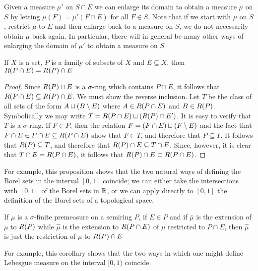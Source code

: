 Given a measure $\mu'$ on $S \cap E$ we can enlarge its domain to obtain a measure $\mu$ on $S$ by letting $\mu(F)=\mu'(F \cap E)$ for all $F \in S$. Note that if we start with $\mu$ on $S$, restrict $\mu$ to $E$ and then enlarge back to a measure on $S$, we do not necessarily obtain $\mu$ back again. In particular, there will in general be many other ways of enlarging the domain of $\mu'$ to obtain a measure on $S$

\begin{proposition}
If $X$ is a set, $P$ is a family of subsets of $X$ and $E \subseteq X$, then $R(P \cap E)=R(P) \cap E$
\end{proposition}


\begin{proof}
Since $R(P) \cap E$ is a $\sigma$-ring which contains $P \cap E$, it follows that $R(P \cap E) \subseteq R(P) \cap E$. We must show the reverse inclusion. Let $T$ be the class of all sets of the form $A\sqcup(B\setminus E)$ where $A \in R(P \cap E)$ and $B \in R(P)$. Symbolically we may write $T=R(P \cap E)\sqcup(R(P)\cap E')$. It is easy to verify that $T$ is a $\sigma$-ring. If $F \in P$, then the relation $F=(F \cap E) \sqcup(F\setminus E)$ and the fact that $F \cap E \in P \cap E \subseteq R(P \cap E)$ show that $F \in T$, and therefore that $P \subseteq T$. It follows that $R(P) \subseteq T$, and therefore that $R(P) \cap E \subseteq T \cap E$. Since, however, it is clear that $T \cap E=R(P \cap E)$, it follows that $R(P) \cap E \subset R(P \cap E)$.
\end{proof}

For example, this proposition shows that the two natural ways of defining the Borel sets in the interval $[0,1]$ coincide; we can either take the intersections with $[0,1]$ of the Borel sets in $\mathbb{R}$, or we can apply directly to $[0,1]$ the definition of the Borel sets of a topological space.

\begin{corollary}
If $\mu$ is a $\sigma$-finite premeasure on a semiring $P$, if $E \in P$ and if $\bar{\mu}$ is the extension of $\mu$ to $R(P)$ while $\hat{\mu}$ is the extension to $R(P \cap E)$ of $\mu$ restricted to $P \cap E$, then $\hat{\mu}$ is just the restriction of $\bar{\mu}$ to $R(P) \cap E$
\end{corollary}

For example, this corollary shows that the two ways in which one might define Lebesgue measure on the interval $[0, 1)$ coincide.

